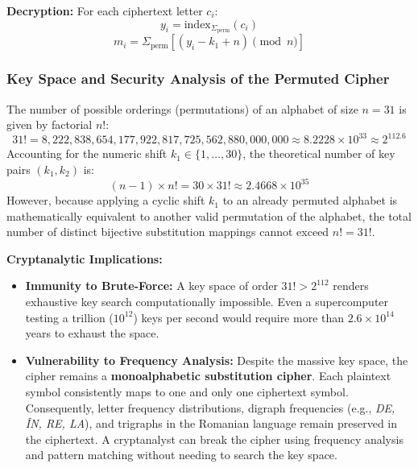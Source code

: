 \documentclass[12pt,a4paper]{article}
\begin{document}
\textbf{Decryption:}
For each ciphertext letter $c_i$:
\begin{equation}
    y_i = \text{index}_{\Sigma_{\text{perm}}}(c_i)
\end{equation}
\begin{equation}
    m_i = \Sigma_{\text{perm}}[(y_i - k_1 + n) \pmod n]
\end{equation}

\subsubsection{Key Space and Security Analysis of the Permuted Cipher}
The number of possible orderings (permutations) of an alphabet of size $n = 31$ is given by factorial $n!$:
\begin{equation}
    31! = 8{,}222{,}838{,}654{,}177{,}922{,}817{,}725{,}562{,}880{,}000{,}000 \approx 8.2228 \times 10^{33} \approx 2^{112.6}
\end{equation}
Accounting for the numeric shift $k_1 \in \{1, \dots, 30\}$, the theoretical number of key pairs $(k_1, k_2)$ is:
\begin{equation}
    (n - 1) \times n! = 30 \times 31! \approx 2.4668 \times 10^{35}
\end{equation}
However, because applying a cyclic shift $k_1$ to an already permuted alphabet is mathematically equivalent to another valid permutation of the alphabet, the total number of distinct bijective substitution mappings cannot exceed $n! = 31!$.

\textbf{Cryptanalytic Implications:}
\begin{itemize}
    \item \textbf{Immunity to Brute-Force:} A key space of order $31! > 2^{112}$ renders exhaustive key search computationally impossible. Even a supercomputer testing a trillion ($10^{12}$) keys per second would require more than $2.6 \times 10^{14}$ years to exhaust the space.
    \item \textbf{Vulnerability to Frequency Analysis:} Despite the massive key space, the cipher remains a \textbf{monoalphabetic substitution cipher}. Each plaintext symbol consistently maps to one and only one ciphertext symbol. Consequently, letter frequency distributions, digraph frequencies (e.g., \textit{DE, ÎN, RE, LA}), and trigraphs in the Romanian language remain preserved in the ciphertext. A cryptanalyst can break the cipher using frequency analysis and pattern matching without needing to search the key space.
\end{itemize}
\end{document}
